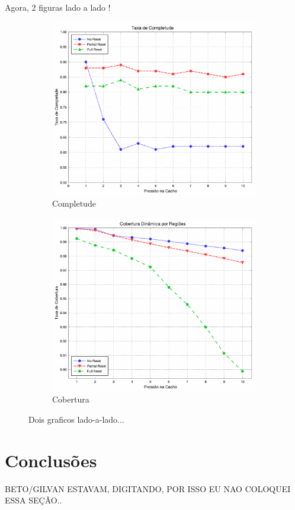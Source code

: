 \documentclass[12pt,twoside]{article}
\begin{document}
Agora, 2 figuras lado a lado !

\begin{figure}[!h!]
        \centering
        \begin{subfigure}[b]{0.45\textwidth}
                \includegraphics[width=\textwidth]{./figs/completion-reset}
                \caption{Completude}
                \label{fig-completude1}
        \end{subfigure}
        \quad %
                \begin{subfigure}[b]{0.45\textwidth}
                \includegraphics[width=\textwidth]{./figs/region-coverage-reset}
                \caption{Cobertura}
                \label{fig-cobertura1}
        \end{subfigure}
\caption{Dois graficos lado-a-lado...}
\end{figure}

\newpage

\section{Conclusões}
\begin{large}
BETO/GILVAN ESTAVAM, DIGITANDO, POR ISSO EU NAO COLOQUEI ESSA SEÇÃO..
\end{large}




\end{document}

